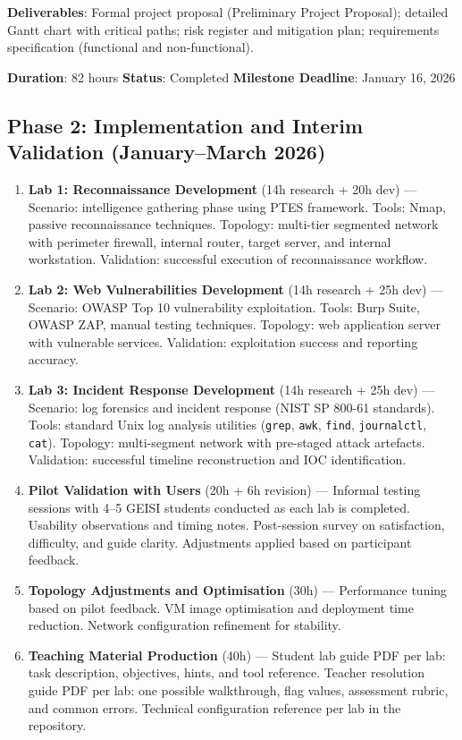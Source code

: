 \textbf{Deliverables}: Formal project proposal (Preliminary Project Proposal); detailed Gantt chart with
critical paths; risk register and mitigation plan; requirements specification (functional
and non-functional).

\textbf{Duration}: 82 hours \quad \textbf{Status}: Completed \quad
\textbf{Milestone Deadline}: January 16, 2026

\subsection{Phase 2: Implementation and Interim Validation (January--March 2026)}

\begin{enumerate}

\item \textbf{Lab 1: Reconnaissance Development} (14h research + 20h dev) ---
Scenario: intelligence gathering phase using PTES framework.
Tools: Nmap\cite{nmap}, passive reconnaissance techniques.
Topology: multi-tier segmented network with perimeter firewall, internal router, target server, and internal workstation.
Validation: successful execution of reconnaissance workflow.

\item \textbf{Lab 2: Web Vulnerabilities Development} (14h research + 25h dev) ---
Scenario: OWASP Top 10 vulnerability exploitation.
Tools: Burp Suite, OWASP ZAP, manual testing techniques.
Topology: web application server with vulnerable services.
Validation: exploitation success and reporting accuracy.

\item \textbf{Lab 3: Incident Response Development} (14h research + 25h dev) ---
Scenario: log forensics and incident response (NIST SP 800-61\cite{nist_sp80061} standards).
Tools: standard Unix log analysis utilities (\texttt{grep}, \texttt{awk},
\texttt{find}, \texttt{journalctl}, \texttt{cat}).
Topology: multi-segment network with pre-staged attack artefacts.
Validation: successful timeline reconstruction and IOC identification.

\item \textbf{Pilot Validation with Users} (20h + 6h revision) ---
Informal testing sessions with 4--5 GEISI students conducted as each lab is completed.
Usability observations and timing notes. Post-session survey on satisfaction, difficulty,
and guide clarity. Adjustments applied based on participant feedback.

\item \textbf{Topology Adjustments and Optimisation} (30h) ---
Performance tuning based on pilot feedback.
VM image optimisation and deployment time reduction.
Network configuration refinement for stability.

\item \textbf{Teaching Material Production} (40h) ---
Student lab guide PDF per lab: task description, objectives, hints,
and tool reference. Teacher resolution guide PDF per lab:
one possible walkthrough, flag values, assessment rubric, and common errors.
Technical configuration reference per lab in the repository.

\end{enumerate}

